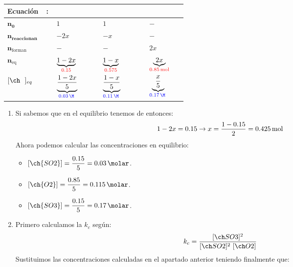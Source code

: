 \begin{exerciseEVAU}
\begin{solu}
\begin{table}[H]
\begin{tabular}{@{}C{0.21\linewidth} @{\,}c@{\,} C{0.21\linewidth} @{\,}c@{\,} C{0.21\linewidth} @{\,}c@{\,} C{0.21\linewidth}@{}}
                \toprule
                \textbf{Ecuación} & : & \textbf{} & \ch{+} & \textbf{} & \ch{->} & \textbf{} \\
                \midrule
                $ \bm{n_0} $ &  & $ 1 $ &  & $ 1 $ &  & $ - $ \\[3pt]
                $ \bm{n_{\text{reaccionan}}} $ &  & $ -2x $ &  & $ -x $ &  & $ - $ \\[3pt]
                $ \bm{n}_{\text{forman}} $ &  & $ - $ &  & $ - $ &  & $ 2x $ \\[3pt]
                $ \bm{n}_{\text{eq}} $ &  & $ \underbrace{1-2x}_{{\color{red} 0.15}}  $ &  & $ \underbrace{1-x}_{{\color{red} 0.575}}$ &  & $ \underbrace{2x}_{{\color{red} \SI{0.85}{\mole}}} $ \\[3pt]
                \( \conc{\ \ }_{eq}\) &  & $\underbrace{\dfrac{1-2x}{5}}_{{\color{blue}\concentracion[m]{0.03}}} $ &  & $\underbrace{\dfrac{1-x}{5}}_{{\color{blue}\concentracion[m]{0.11}}}$ &  & $\underbrace{\dfrac{x}{5}}_{{\color{blue}\concentracion[m]{0.17}}}$ \\
                \bottomrule
            \end{tabular}
        \end{table}
        \begin{enumerate}[label=\letraminuscula]
\item Si sabemos que en el equilibrio tenemos  de  entonces:
\begin{equation*}
    1-2x = 0.15 \rightarrow x = \dfrac{1-0.15}{2} = \SI{0.425}{\mole}
\end{equation*}
Ahora podemos calcular las concentraciones en equilibrio:
\begin{multicols}{2}
    \begin{itemize}
        \item \([\ch{SO2}] = \dfrac{0.15}{5} = \SI{0.03}{\molar}\).
        \item \([\ch{O2}] = \dfrac{0.85}{5} = \SI{0.115}{\molar}\).
        \item \([\ch{SO3}] = \dfrac{0.15}{5} = \SI{0.17}{\molar}\).
    \end{itemize}
\end{multicols}
\item Primero calculamos la \(k_c\) según:
\begin{equation*}
    k_c = \dfrac{\conc{SO3}^2}{\conc{SO2}^2\ \conc{O2}}
\end{equation*}
Sustituimos las concentraciones calculadas en el apartado anterior teniendo finalmente que:

\end{enumerate}
\end{solu}
\end{exerciseEVAU}
